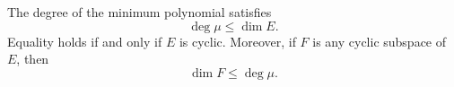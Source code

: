 The degree of the minimum polynomial satisfies
$$\deg \mu \leq \dim E.$$
Equality holds if and only if $E$ is cyclic. Moreover, if $F$ is any cyclic subspace of $E$, then
$$\dim F \leq \deg \mu.$$
